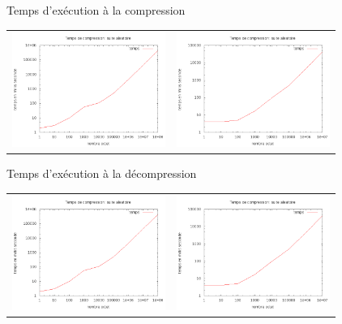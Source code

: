 \documentclass[french]{beamer}
\begin{document}
\begin{frame}{Temps d'exécution à la compression} 
	\begin{center}
	\begin{tabular}{l | l}
	\includegraphics[width=5cm]{tempsChA.png} & 
	\includegraphics[width=5cm]{tempsClzA.png}
	\end{tabular}	
	\end{center}
\end{frame}

\begin{frame}{Temps d'exécution à la décompression}
	\begin{center}
	\begin{tabular}{l | l}
	\includegraphics[width=5cm]{tempsChA.png} & 
	\includegraphics[width=5cm]{tempsClzA.png}
	\end{tabular}
	\end{center}
\end{frame}
\end{document}
